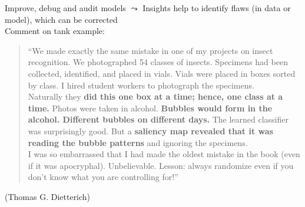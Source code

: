 \documentclass[10pt,compress,t,notes=noshow, xcolor=table]{beamer}
\begin{document}
\begin{framev}[align=top]{Improve, debug and audit models}
$\leadsto$ Insights help to identify flaws (in data or model), which can be corrected \\
\spacer[0.25]
\centering
Comment on tank example:
\begin{quote}
``We made exactly the same mistake in one of my projects on insect recognition. We photographed 54 classes of insects. Specimens had been collected, identified, and placed in vials. Vials were placed in boxes sorted by class. I hired student workers to photograph the specimens.\\
\spacer[0.25]
Naturally they \textbf{did this one box at a time; hence, one class at a time.} Photos were taken in alcohol. \textbf{Bubbles would form in the alcohol. Different bubbles on different days.} The learned classifier was surprisingly good. But a \textbf{saliency map revealed that it was reading the bubble patterns} and ignoring the specimens.\\
\spacer[0.25]
I was so embarrassed that I had made the oldest mistake in the book (even if it was apocryphal). Unbelievable. Lesson: always randomize even if you don't know what you are controlling for!''
\end{quote}
(Thomas G. Dietterich) 
\end{framev}
\end{document}
